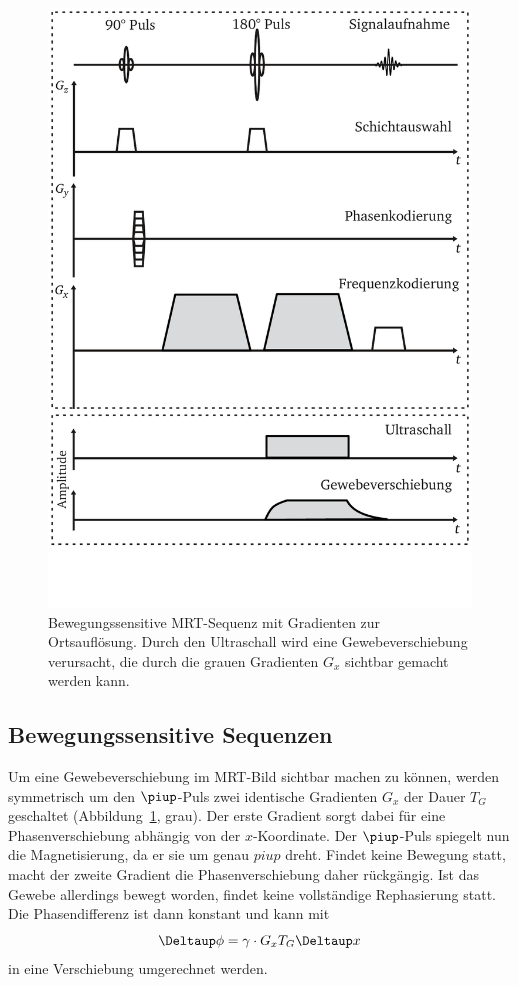 \documentclass[
    11pt,
    ngerman
]{scrreprt}
\begin{document}
\begin{figure}
    \centering
    \includegraphics[width=.7\textwidth]{Abbildungen/sediffmono.pdf}
    \caption{%
        Bewegungssensitive MRT-Sequenz mit Gradienten zur Ortsauflösung. Durch den Ultraschall wird eine Gewebeverschiebung verursacht, die durch die grauen Gradienten $G_x$ sichtbar gemacht werden kann.
    }
    \label{fig:bew-sens-sequenz}
\end{figure}

\subsection{Bewegungssensitive Sequenzen}

Um eine Gewebeverschiebung im MRT-Bild sichtbar machen zu können, werden symmetrisch um den $\piup$-Puls zwei identische Gradienten $G_x$ der Dauer $T_G$ geschaltet (Abbildung~\ref{fig:bew-sens-sequenz}, grau). Der erste Gradient sorgt dabei für eine Phasenverschiebung abhängig von der $x$-Koordinate. Der $\piup$-Puls spiegelt nun die Magnetisierung, da er sie um genau $piup$ dreht. Findet keine Bewegung statt, macht der zweite Gradient die Phasenverschiebung daher rückgängig. Ist das Gewebe allerdings bewegt worden, findet keine vollständige Rephasierung statt. Die Phasendifferenz ist dann konstant und kann mit
\[
    \Deltaup \phi = \gamma \cdot G_x T_G \Deltaup x
\]
in eine Verschiebung umgerechnet werden.
\end{document}
